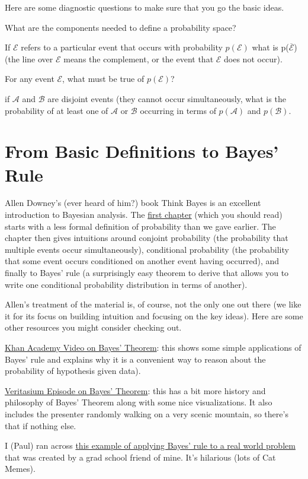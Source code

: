 \documentclass[assignment01_Solutions]{subfiles}
\begin{document}
\begin{exercise}
Here are some diagnostic questions to make sure that you go the basic ideas.
\bes
\item What are the components needed to define a probability space?
\item If $\mathcal{E}$ refers to a particular event that occurs with probability $p(\mathcal{E})$ what is p($\overline{\mathcal{E}}$) (the line over $\mathcal{E}$ means the complement, or the event that $\mathcal{E}$ does not occur).
\item For any event $\mathcal{E}$, what must be true of $p(\mathcal{E})$?
\item if $\mathcal{A}$ and $\mathcal{B}$ are disjoint events (they cannot occur simultaneously, what is the probability of at least one of $\mathcal{A}$ or $\mathcal{B}$ occurring in terms of $p(\mathcal{A})$ and $p(\mathcal{B})$.
\ees
\end{exercise}

\section{From Basic Definitions to Bayes' Rule}

\begin{externalresources}
Allen Downey's (ever heard of him?) book Think Bayes is an excellent introduction to Bayesian analysis.  The \href{http://www.greenteapress.com/thinkbayes/html/thinkbayes002.html}{first chapter} (which you should read) starts with a less formal definition of probability than we gave earlier.  The chapter then gives intuitions around conjoint probability (the probability that multiple events occur simultaneously), conditional probability (the probability that some event occurs conditioned on another event having occurred), and finally to Bayes' rule (a surprisingly easy theorem to derive that allows you to write one conditional probability distribution in terms of another).

Allen's treatment of the material is, of course, not the only one out there (we like it for its focus on building intuition and focusing on the key ideas).  Here are some other resources you might consider checking out.
\bi
\item \href{https://www.khanacademy.org/partner-content/wi-phi/wiphi-critical-thinking/wiphi-fundamentals/v/bayes-theorem}{Khan Academy Video on Bayes' Theorem}: this shows some simple applications of Bayes' rule and explains why it is a convenient way to reason about the probability of hypothesis given data).
\item \href{https://www.youtube.com/watch?v=R13BD8qKeTg}{Veritasium Episode on Bayes' Theorem}: this has a bit more history and philosophy of Bayes' Theorem along with some nice visualizations.  It also includes the presenter randomly walking on a very scenic mountain, so there's that if nothing else.
\item I (Paul) ran across \href{youtube.com/watch?v=nvqXXlz-rx0}{this example of applying Bayes' rule to a real world problem} that was created by a grad school friend of mine.  It's hilarious (lots of Cat Memes).
\ei

\end{externalresources}
\end{document}
